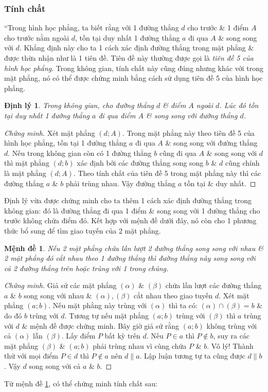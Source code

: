 \documentclass[oneside]{book}
\numberwithin{equation}{section}
\newtheorem{menhde}{Mệnh đề}[section]
\newtheorem{dinhly}{Định lý}[section]
\begin{document}
\subsubsection{Tính chất}
``Trong hình học phẳng, ta biết rằng với 1 đường thẳng $d$ cho trước \& 1 điểm $A$ cho trước nằm ngoài $d$, tồn tại duy nhất 1 đường thẳng $a$ đi qua $A$ \& song song với $d$. Khẳng định này cho ta 1 cách xác định đường thẳng trong mặt phẳng \& được thừa nhận như là 1 tiên đề. Tiên đề này thường được gọi là \textit{tiên đề 5 của hình học phẳng}. Trong không gian, tính chất này cũng đúng nhưng khác với trong mặt phẳng, nó có thể được chứng minh bằng cách sử dụng tiên đề 5 của hình học phẳng.

\begin{dinhly}
	Trong không gian, cho đường thẳng $d$ \& điểm $A$ ngoài $d$. Lúc đó tồn tại duy nhất 1 đường thẳng $a$ đi qua điểm $A$ \& song song với đường thẳng $d$.
\end{dinhly}

\begin{proof}[Chứng minh]
	Xét mặt phẳng $(d;A)$. Trong mặt phẳng này theo tiên đề 5 của hình học phẳng, tồn tại 1 đường thẳng $a$ đi qua $A$ \& song song với đường thẳng $d$. Nếu trong không gian còn có 1 đường thẳng $b$ cũng đi qua $A$ \& song song với $d$ thì mặt phẳng $(d;b)$ xác định bởi các đường thẳng song song $b$ \& $d$ cũng chính là mặt phẳng $(d;A)$. Theo tính chất của tiên đề 5 trong mặt phẳng này thì các đường thẳng $a$ \& $b$ phải trùng nhau. Vậy đường thẳng $a$ tồn tại \& duy nhất.
\end{proof}
Định lý vừa được chứng minh cho ta thêm 1 cách xác định đường thẳng trong không gian: đó là đường thẳng đi qua 1 điểm \& song song với 1 đường thẳng cho trước không chứa điểm đó. Kết hợp với mệnh đề dưới đây, nó còn cho 1 phương thức bổ sung để tìm giao tuyến của 2 mặt phẳng.

\begin{menhde}
	\label{TLCT Hinh Hoc 11 Menh de 1 p. 61}
	Nếu 2 mặt phẳng chứa lần lượt 2 đường thẳng song song với nhau \& 2 mặt phẳng đó cắt nhau theo 1 đường thẳng thì đường thẳng này song song với cả 2 đường thẳng trên hoặc trùng với 1 trong chúng.
\end{menhde}

\begin{proof}[Chứng minh]
	Giả sử các mặt phẳng $(\alpha)$ \& $(\beta)$ chứa lần lượt các đường thẳng $a$ \& $b$ song song với nhau \& $(\alpha),(\beta)$ cắt nhau theo giao tuyến $d$. Xét mặt phẳng $(a;b)$. Nếu mặt phẳng này trùng với $(\alpha)$ thì ta có: $(\alpha)\cap(\beta) = b$ \& do đó $b$ trùng với $d$. Tương tự nếu mặt phẳng $(a;b)$ trùng với $(\beta)$ thì $a$ trùng với $d$ \& mệnh đề được chứng minh. Bây giờ giả sử rằng $(a;b)$ không trùng với cả $(\alpha)$ lẫn $(\beta)$. Lấy điểm $P$ bất kỳ trên $d$. Nếu $P\in a$ thì $P\notin b$, suy ra các mặt phẳng $(\beta)$ \& $(a;b)$ phải trùng nhau vì cùng chứa $P$ \& $b$. Vô lý! Thành thử với mọi điểm $P\in d$ thì $P\notin a$ nên $d\parallel a$. Lập luận tương tự ta cũng được $d\parallel b$. Vậy $d$ song song với cả $a$ \& $b$.
\end{proof}
Từ mệnh đề \ref{TLCT Hinh Hoc 11 Menh de 1 p. 61}, có thể chứng minh tính chất sau:
\end{document}
